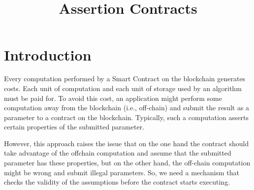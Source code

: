 \documentclass[runningheads]{llncs}
\begin{document}
%
\title{Assertion Contracts}
%
%

%
%
%
\maketitle              %
%
\begin{abstract}
 \keywords{}
\end{abstract}

%
%
%
\section{Introduction}
\label{sec:introduction}
Every computation performed by a Smart Contract on the blockchain generates costs. Each
unit of computation and each unit of storage used by an algorithm must be paid for. To
avoid this cost, an application might perform some computation away from the blockchain
(i.e., off-chain) and submit the result as a parameter to a contract on the
blockchain. Typically, such a computation asserts certain properties of the 
submitted parameter. 

However, this approach raises the issue that on the one hand the contract should take
advantage of the offchain computation and assume that the submitted parameter has
these properties, but on the other hand, the off-chain computation might be wrong and
submit illegal parameters. So, we need a mechanism that checks the validity of the
assumptions before the contract starts executing.
\end{document}

